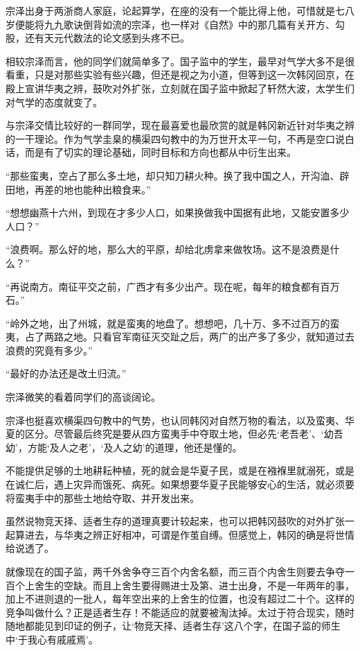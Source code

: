宗泽出身于两浙商人家庭，论起算学，在座的没有一个能比得上他，可惜就是七八岁便能将九九歌诀倒背如流的宗泽，也一样对《自然》中的那几篇有关开方、勾股，还有天元代数法的论文感到头疼不已。

相较宗泽而言，他的同学们就简单多了。国子监中的学生，最早对气学大多不是很看重，只是对那些实验有些兴趣，但还是视之为小道，但等到这一次韩冈回京，在殿上宣讲华夷之辨，鼓吹对外扩张，立刻就在国子监中掀起了轩然大波，太学生们对气学的态度就变了。

与宗泽交情比较好的一群同学，现在最喜爱也最欣赏的就是韩冈新近针对华夷之辨的一干理论。作为气学圭臬的横渠四句教中的为万世开太平一句，不再是空口说白话，而是有了切实的理论基础，同时目标和方向也都从中衍生出来。

“那些蛮夷，空占了那么多土地，却只知刀耕火种。换了我中国之人，开沟洫、辟田地，再差的地也能种出粮食来。”

“想想幽燕十六州，到现在才多少人口，如果换做我中国据有此地，又能安置多少人口？”

“浪费啊。那么好的地，那么大的平原，却给北虏拿来做牧场。这不是浪费是什么？”

“再说南方。南征平交之前，广西才有多少出产。现在呢，每年的粮食都有百万石。”

“岭外之地，出了州城，就是蛮夷的地盘了。想想吧，几十万、多不过百万的蛮夷，占了两路之地。只看官军南征灭交趾之后，两广的出产多了多少，就知道过去浪费的究竟有多少。”

“最好的办法还是改土归流。”

宗泽微笑的看着同学们的高谈阔论。

宗泽也挺喜欢横渠四句教中的气势，也认同韩冈对自然万物的看法，以及蛮夷、华夏的区分。尽管最后终究是要从四方蛮夷手中夺取土地，但必先‘老吾老’、‘幼吾幼’，方能‘及人之老’，‘及人之幼’的道理，他还是懂的。

不能提供足够的土地耕耘种植，死的就会是华夏子民，或是在襁褓里就溺死，或是在诚仁后，遇上灾异而饿死、病死。如果想要华夏子民能够安心的生活，就必须要将蛮夷手中的那些土地给夺取、并开发出来。

虽然说物竞天择、适者生存的道理真要计较起来，也可以把韩冈鼓吹的对外扩张一起算进去，与华夷之辨正好相冲，可谓是作茧自缚。但感觉上，韩冈的确是将世情给说透了。

就像现在的国子监，两千外舍争夺三百个内舍名额，而三百个内舍生则要去争夺一百个上舍生的空缺。而且上舍生要得赐进士及第、进士出身，不是一年两年的事，加上不进则退的一批人，每年空出来的上舍生的位置，也没有超过二十个。这样的竞争叫做什么？正是适者生存！不能适应的就要被淘汰掉。太过于符合现实，随时随地都能见到印证的例子，让‘物竞天择、适者生存’这八个字，在国子监的师生中‘于我心有戚戚焉’。

